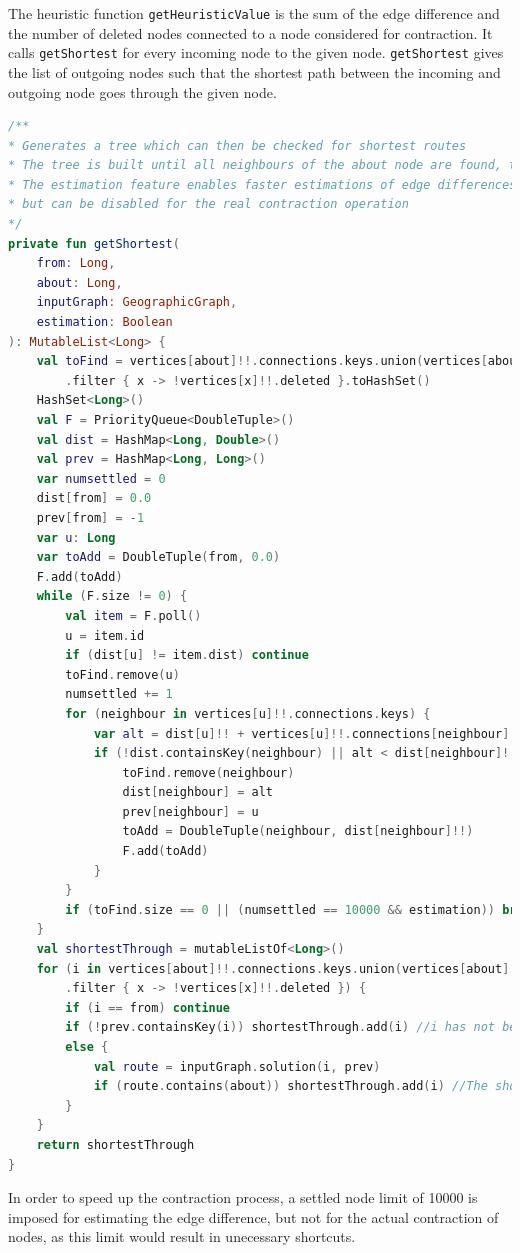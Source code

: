 \documentclass[11pt,twoside,a4paper]{report}
\begin{document}
The heuristic function \texttt{getHeuristicValue} is the sum of the edge difference and the number of deleted nodes connected to a node considered for contraction. It calls \texttt{getShortest} for every incoming node to the given node. \texttt{getShortest} gives the list of outgoing nodes such that the shortest path between the incoming and outgoing node goes through the given node. 
\begin{lstlisting}[language=kotlin]
/**
* Generates a tree which can then be checked for shortest routes
* The tree is built until all neighbours of the about node are found, then queried to find if the shortest route goes through the about node
* The estimation feature enables faster estimations of edge differences by terminating the search after a given number of nodes,
* but can be disabled for the real contraction operation
*/
private fun getShortest(
    from: Long,
    about: Long,
    inputGraph: GeographicGraph,
    estimation: Boolean
): MutableList<Long> {
    val toFind = vertices[about]!!.connections.keys.union(vertices[about]!!.shortcutConnections.keys)
        .filter { x -> !vertices[x]!!.deleted }.toHashSet()
    HashSet<Long>()
    val F = PriorityQueue<DoubleTuple>()
    val dist = HashMap<Long, Double>()
    val prev = HashMap<Long, Long>()
    var numsettled = 0
    dist[from] = 0.0
    prev[from] = -1
    var u: Long
    var toAdd = DoubleTuple(from, 0.0)
    F.add(toAdd)
    while (F.size != 0) {
        val item = F.poll()
        u = item.id
        if (dist[u] != item.dist) continue
        toFind.remove(u)
        numsettled += 1
        for (neighbour in vertices[u]!!.connections.keys) {
            var alt = dist[u]!! + vertices[u]!!.connections[neighbour]!!
            if (!dist.containsKey(neighbour) || alt < dist[neighbour]!!) {
                toFind.remove(neighbour)
                dist[neighbour] = alt
                prev[neighbour] = u
                toAdd = DoubleTuple(neighbour, dist[neighbour]!!)
                F.add(toAdd)
            }
        }
        if (toFind.size == 0 || (numsettled == 10000 && estimation)) break
    }
    val shortestThrough = mutableListOf<Long>()
    for (i in vertices[about]!!.connections.keys.union(vertices[about]!!.shortcutConnections.keys)
        .filter { x -> !vertices[x]!!.deleted }) {
        if (i == from) continue
        if (!prev.containsKey(i)) shortestThrough.add(i) //i has not been reached because contraction has been terminated early, therefore a shortcut is necessary
        else {
            val route = inputGraph.solution(i, prev)
            if (route.contains(about)) shortestThrough.add(i) //The shortest route goes through the node therefore a shortcut is necessary
        }
    }
    return shortestThrough
}
\end{lstlisting}
In order to speed up the contraction process, a settled node limit of 10000 is imposed for estimating the edge difference, but not for the actual contraction of nodes, as this limit would result in unecessary shortcuts.
\newpage
\end{document}
